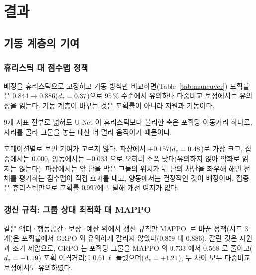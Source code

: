 \section{결과}
\label{sec:results}

\subsection{기동 계층의 기여}
\label{sec:res_g1}

\subsubsection{휴리스틱 대 점수맵 정책}
\label{sec:res_maneuver}

배정을 휴리스틱으로 고정하고 기동 방식만 비교하면(Table~\ref{tab:maneuver}) 포획률은
$0.844 \to 0.886$($d_z = 0.37$)으로 $95\,\%$ 수준에서 유의하나 다중비교 보정에서는 유의성을 잃는다.
기동 계층이 바꾸는 것은 포획률이 아니라 자원과 기동이다.




9개 지표 전부로 넓혀도 U-Net 이 휴리스틱보다 불리한 축은 포획당 이동거리 하나로, 자리를 골라
그물을 놓는 대신 더 멀리 움직이기 때문이다.

포메이션별로 보면 기여가 고르지 않다. 파상에서 $+0.157$($d_z = 0.48$)로 가장 크고, 집중에서는
$0.000$, 양동에서는 $-0.033$ 으로 오히려 소폭 낮다(유의하지 않아 악화로 읽지는 않는다).
파상에서는 앞 단을 막은 그물의 위치가 뒤 단의 차단을 좌우해 해면 전체를 평가하는 점수맵이
직접 효과를 내고, 양동에서는 결정적인 것이 배정이며, 집중은 휴리스틱만으로 포획률 0.997에 도달해
개선 여지가 없다.

\subsubsection{갱신 규칙: 그룹 상대 최적화 대 MAPPO}
\label{sec:res_algo}

같은 액터·행동공간·보상·예산 위에서 갱신 규칙만 MAPPO~\citep{yu2022mappo}로 바꾼 정책(시드 3개)은
포획률에서 GRPO 와 유의하게 갈리지 않았다($0.859$ 대 $0.886$). 갈린 것은 자원과 조기 제압으로,
GRPO 는 포획당 그물을 MAPPO 의 $0.733$ 에서 $0.568$ 로 줄이고($d_z = -1.19$) 포획 이격거리를
$0.61\,\ell$ 늘렸으며($d_z = +1.21$), 두 차이 모두 다중비교 보정에서도 유의하였다.

